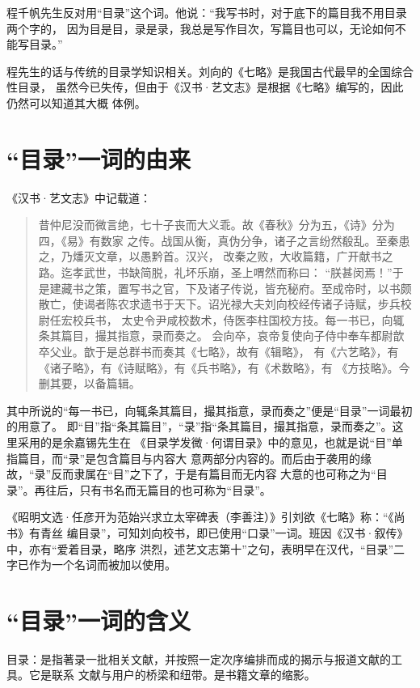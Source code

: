 程千帆先生反对用“目录”这个词。他说：“我写书时，对于底下的篇目我不用目录两个字的，
因为目是目，录是录，我总是写作目次，写篇目也可以，无论如何不能写目录。”\cite{cheng2008}

程先生的话与传统的目录学知识相关。刘向的《七略》是我国古代最早的全国综合性目录，
虽然今已失传，但由于《汉书·艺文志》是根据《七略》编写的，因此仍然可以知道其大概
体例。

\section{“目录”一词的由来}

《汉书·艺文志》中记载道：

\begin{quotation}
昔仲尼没而微言绝，七十子丧而大义乖。故《春秋》分为五，《诗》分为四，《易》有数家
之传。战国从衡，真伪分争，诸子之言纷然殽乱。至秦患之，乃燔灭文章，以愚黔首。汉兴，
改秦之败，大收篇籍，广开献书之路。迄孝武世，书缺简脱，礼坏乐崩，圣上喟然而称曰：
“朕甚闵焉！”于是建藏书之策，置写书之官，下及诸子传说，皆充秘府。至成帝时，以书颇
散亡，使谒者陈农求遗书于天下。诏光禄大夫刘向校经传诸子诗赋，步兵校尉任宏校兵书，
太史令尹咸校数术，侍医李柱国校方技。每一书已，向辄条其篇目，撮其指意，录而奏之。
会向卒，哀帝复使向子侍中奉车都尉歆卒父业。歆于是总群书而奏其《七略》，故有《辑略》，
有《六艺略》，有《诸子略》，有《诗赋略》，有《兵书略》，有《术数略》，有
《方技略》。今删其要，以备篇辑。
\end{quotation}

其中所说的“每一书已，向辄条其篇目，撮其指意，录而奏之”便是“目录”一词最初的用意了。
即“目”指“条其篇目”，“录”指“条其篇目，撮其指意，录而奏之”。这里采用的是余嘉锡先生在
《目录学发微·何谓目录》中的意见，也就是说“目”单指篇目，而“录”是包含篇目与内容大
意两部分内容的。而后由于袭用的缘故，“录”反而隶属在“目”之下了，于是有篇目而无内容
大意的也可称之为“目录”。再往后，只有书名而无篇目的也可称为“目录”。

《昭明文选·任彦开为范始兴求立太宰碑表（李善注）》引刘欲《七略》称：“《尚书》有青丝
编目录”，可知刘向校书，即已使用“口录”一词。班因《汉书·叙传》中，亦有“爱着目录，略序
洪烈，述艺文志第十”之句，表明早在汉代，“目录”二字已作为一个名词而被加以使用。

\section{“目录”一词的含义}

目录：是指著录一批相关文献，并按照一定次序编排而成的揭示与报道文献的工具。它是联系
文献与用户的桥梁和纽带。是书籍文章的缩影。

